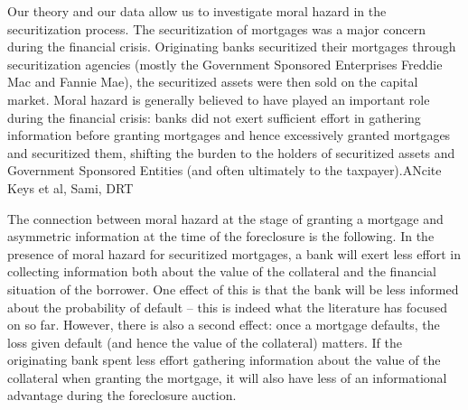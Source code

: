 \documentclass[11pt,twopage]{article}
\begin{document}
%

Our theory and our data allow us to investigate moral hazard in the
securitization process.  The securitization of mortgages was a major
concern during the financial crisis.  Originating banks securitized
their mortgages through securitization agencies (mostly the Government
Sponsored Enterprises Freddie Mac and Fannie Mae), the securitized
assets were then sold on the capital market. Moral hazard is generally
believed to have played an important role during the financial crisis:
banks did not exert sufficient effort in gathering information before
granting mortgages and hence excessively granted mortgages and
securitized them, shifting the burden to the holders of securitized
assets and Government Sponsored Entities (and often ultimately to the
taxpayer).AN{cite Keys et al, Sami, DRT}

The connection between moral hazard at the stage of granting a
mortgage and asymmetric information at the time of the foreclosure is
the following. In the presence of moral hazard for securitized
mortgages, a bank will exert less effort in collecting information
both about the value of the collateral and the financial situation of
the borrower. One effect of this is that the bank will be less
informed about the probability of default -- this is indeed what the
literature has focused on so far. However, there is also a second
effect: once a mortgage defaults, the loss given default (and hence
the value of the collateral) matters. If the originating bank spent
less effort gathering information about the value of the collateral
when granting the mortgage, it will also have less of an informational
advantage during the foreclosure auction.
\end{document}
